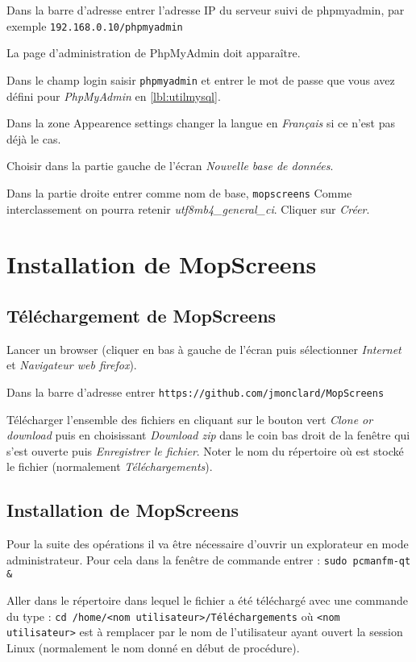 \documentclass[a4paper]{ffco-rapport}
\begin{document}
		Dans la barre d'adresse entrer l'adresse IP du serveur suivi de phpmyadmin, par exemple \verb|192.168.0.10/phpmyadmin|
		
		La page d'administration de PhpMyAdmin doit apparaître.
		
		Dans le champ \og{}login\fg{} saisir \verb|phpmyadmin| et entrer le mot de passe que vous avez défini pour \emph{PhpMyAdmin} en \ref{lbl:utilmysql}.
		
		Dans la zone \og{}Appearence settings\fg{} changer la langue en \emph{Français} si ce n'est pas déjà le cas.
		
		Choisir dans la partie gauche de l'écran \emph{Nouvelle base de données}.
		
		Dans la partie droite entrer comme nom de base, \verb|mopscreens| Comme interclassement on pourra retenir \emph{utf8mb4\_general\_ci}. Cliquer sur \emph{Créer}.

\section{Installation de MopScreens}

	\subsection{Téléchargement de MopScreens}
		Lancer un browser (cliquer en bas à gauche de l'écran puis sélectionner \emph{Internet} et \emph{Navigateur web firefox}).
		
		Dans la barre d'adresse entrer \verb|https://github.com/jmonclard/MopScreens|
		
		Télécharger l'ensemble des fichiers en cliquant sur le bouton vert \emph{Clone or download} puis en choisissant \emph{Download zip} dans le coin bas droit de la fenêtre qui s'est ouverte puis \emph{Enregistrer le fichier}. Noter le nom du répertoire où est stocké le fichier (normalement \emph{Téléchargements}).
		
	\subsection{Installation de MopScreens}
		Pour la suite des opérations il va être nécessaire d'ouvrir un explorateur en mode administrateur.
		Pour cela dans la fenêtre de commande entrer : \verb|sudo pcmanfm-qt &|
		
		Aller dans le répertoire dans lequel le fichier a été téléchargé avec une commande du type : \verb|cd /home/<nom utilisateur>/Téléchargements| où \verb|<nom utilisateur>| est à remplacer par le nom de l'utilisateur ayant ouvert la session Linux (normalement le nom donné en début de procédure).
		
\end{document}
